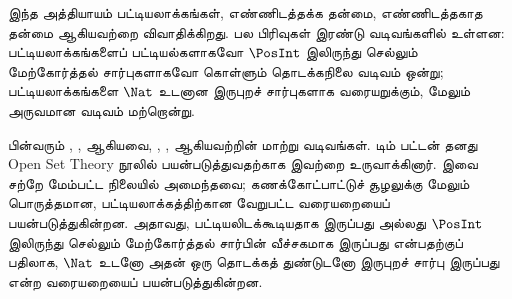 \documentclass[../../../include/open-logic-chapter]{subfiles}
\begin{document}

\begin{editorial}
இந்த அத்தியாயம் பட்டியலாக்கங்கள், எண்ணிடத்தக்க தன்மை,
எண்ணிடத்தகாத தன்மை ஆகியவற்றை விவாதிக்கிறது.
பல பிரிவுகள் இரண்டு வடிவங்களில் உள்ளன:
பட்டியலாக்கங்களைப் பட்டியல்களாகவோ $\PosInt$ இலிருந்து செல்லும்
மேற்கோர்த்தல் சார்புகளாகவோ கொள்ளும் தொடக்கநிலை வடிவம் ஒன்று;
பட்டியலாக்கங்களை $\Nat$ உடனான இருபுறச் சார்புகளாக வரையறுக்கும்,
மேலும் அருவமான வடிவம் மற்றொன்று.
\end{editorial}











\begin{editorial}
பின்வரும் ,
,  ஆகியவை,
, ,
 ஆகியவற்றின் மாற்று வடிவங்கள்.
டிம் பட்டன் தனது Open Set Theory நூலில் பயன்படுத்துவதற்காக
இவற்றை உருவாக்கினார்.
இவை சற்றே மேம்பட்ட நிலையில் அமைந்தவை; கணக்கோட்பாட்டுச் சூழலுக்கு
மேலும் பொருத்தமான, பட்டியலாக்கத்திற்கான வேறுபட்ட வரையறையைப்
பயன்படுத்துகின்றன.
அதாவது, பட்டியலிடக்கூடியதாக இருப்பது அல்லது $\PosInt$ இலிருந்து
செல்லும் மேற்கோர்த்தல் சார்பின் வீச்சகமாக இருப்பது என்பதற்குப் பதிலாக,
$\Nat$ உடனோ அதன் ஒரு தொடக்கத் துண்டுடனோ இருபுறச் சார்பு இருப்பது
என்ற வரையறையைப் பயன்படுத்துகின்றன.
\end{editorial}


\OLEndChapterHook
\end{document}
